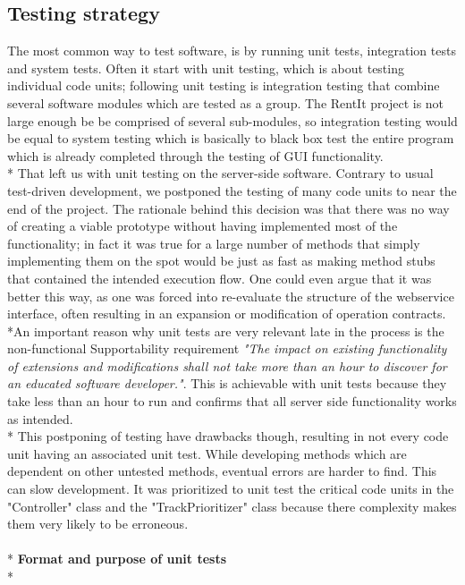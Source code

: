 \documentclass[a4paper,11pt,report]{article}
\begin{document}
{\subsection{Testing strategy}
The most common way to test software, is by running unit tests, integration tests and system tests. Often it start with unit testing, which is about testing individual code units; following unit testing is integration testing that combine several software modules which are tested as a group. The RentIt project is not large enough be be comprised of
several sub-modules, so integration testing would be equal to system testing which is basically to black box test the entire program which is already completed
through the testing of GUI functionality.
\\*
That left us with unit testing on the server-side software. Contrary to usual test-driven development, we postponed the testing of many code units to near
the end of the project. The rationale behind this decision was that there was no way of creating a viable prototype without having implemented most of the 
functionality; in fact it was true for a large number of methods that simply implementing them on the spot would be just as fast as making method stubs 
that contained the intended execution flow. One could even argue that it was better this way, as one was forced into re-evaluate the structure of the webservice
interface, often resulting in an expansion or modification of operation contracts. \\*An important reason why unit tests are very relevant late in the process is the non-functional Supportability requirement 
\textit{"The impact on existing functionality of extensions and modifications shall not take more than an hour to discover for an educated software developer."}.
This is achievable with unit tests because they take less than an hour to run and confirms that all server side functionality works as intended.
\\*
This postponing of testing have drawbacks though, resulting in not every code unit having an associated unit test. While developing methods which are dependent on other untested methods, eventual errors are harder to find. This can slow development. It was prioritized to unit test the
critical code units in the "Controller" class and the "TrackPrioritizer" class because there complexity makes them very likely to be erroneous.\\ \\*
\textbf{Format and purpose of unit tests}\\*
}
\end{document}
